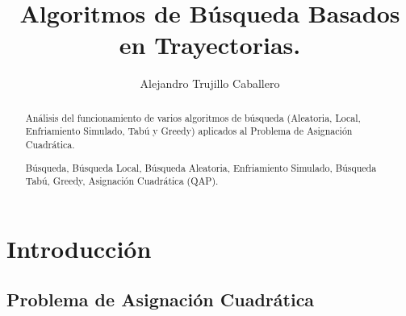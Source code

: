 \documentclass[runningheads,a4paper]{llncs}
\newcommand{\keywords}[1]{\par\addvspace\baselineskip
\noindent\keywordname\enspace\ignorespaces#1}
\begin{document}
\mainmatter  %

\title{Algoritmos de Búsqueda Basados en Trayectorias.}


%
%
\author{Alejandro Trujillo Caballero
}
%


%
%

\maketitle

\begin{abstract}
Análisis del funcionamiento de varios algoritmos de búsqueda (Aleatoria, Local, Enfriamiento Simulado, Tabú y Greedy) aplicados al Problema de Asignación Cuadrática.
\keywords{Búsqueda, Búsqueda Local, Búsqueda Aleatoria, Enfriamiento Simulado, Búsqueda Tabú, Greedy, Asignación Cuadrática (QAP).}
\end{abstract}


\section{Introducción}

\subsection{Problema de Asignación Cuadrática}
\end{document}
